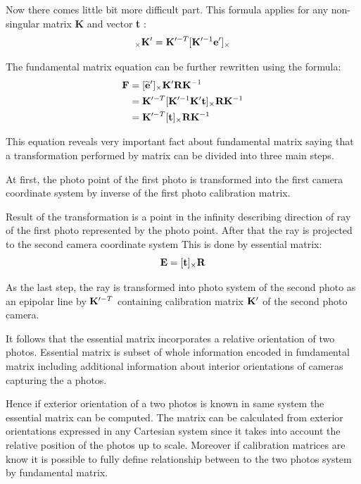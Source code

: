 \documentclass[a4paper,12pt]{article}
\newcommand{\ematr}[1]{
{\bf #1}
}
\newcommand{\evect}[1]{
{\bf #1}
}
\newcommand{\ehvect}[1]{
{\bf \widetilde{#1}}
}
\begin{document}
Now there comes little bit more difficult part.
This formula applies for any non-singular matrix \ematr{K} and vector \evect{t}:
\begin{equation}
[\evect{e}']_{\times} \ematr{K'} = \ematr{K}'^{-T}[\ematr{K}'^{-1}\evect{e}']_{\times}
\end{equation}

The fundamental matrix equation can be further rewritten using the formula:  
\begin{equation}
\begin{split}
\ematr{F}  &= [\ehvect{e}']_{\times} \ematr{K}' \ematr{R} \ematr{K}^{-1} \\
	   &= \ematr{K}'^{-T} [\ematr{K}'^{-1} \ematr{K}' \evect{t}]_{\times} \ematr{R} \ematr{K}^{-1} \\
	   &= \ematr{K}'^{-T} [\evect{t}]_{\times} \ematr{R} \ematr{K}^{-1}
\end{split}
\end{equation}

This equation reveals very important fact about fundamental matrix saying that a transformation performed 
by matrix can be divided into three main steps.

At first, the photo point of the first photo is transformed into the first camera coordinate system  by  inverse of the 
first photo calibration matrix. 

Result of the transformation is a
point in the infinity describing direction of ray of the first photo represented by the photo point. 
After that the ray is projected to the second camera coordinate system
This is done by essential matrix:
\begin{equation}
	 \ematr{E}  = [\evect{t}]_{\times} \ematr{R}
\end{equation}

As the last step, the ray is transformed into photo system of the second photo as an epipolar line
by $\ematr{K}'^{-T}$ containing calibration matrix $\ematr{K}'$ of the second photo camera.

It follows that the essential matrix incorporates a relative orientation of two photos.
Essential matrix is subset of whole information encoded in fundamental matrix including
additional information about interior orientations of cameras capturing the a photos.  

Hence if exterior orientation of a two photos is known in same system the
essential matrix can be computed. The matrix can be calculated from exterior 
orientations expressed in any Cartesian system since it takes into account the relative 
position of the photos up to scale. Moreover if calibration matrices 
are know it is possible to fully define relationship between 
to the two photos system by fundamental matrix.
\end{document}

